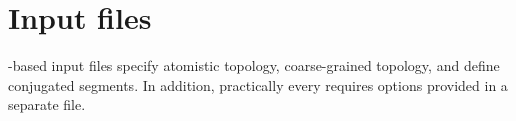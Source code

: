 \chapter{Input files}
\label{sec:mapping}

\xml-based input files specify atomistic topology, coarse-grained topology, and define conjugated segments. In addition, practically every \calculator requires options provided in a separate \xml file.





